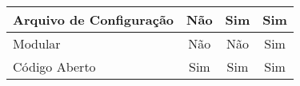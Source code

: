 \begin{table}[H]
\begin{tabular}{l|c|c|c}
Arquivo de Configuração                                                             & Não                                                                                       & Sim            & Sim            \\ \hline
Modular                                                                             & Não                                                                                       & Não            & Sim            \\ \hline
Código Aberto                                                                       & Sim                                                                                       & Sim            & Sim
\end{tabular}
\end{table}

\vspace*{-0,9cm}
{\raggedright {}}
\vspace*{1cm}

